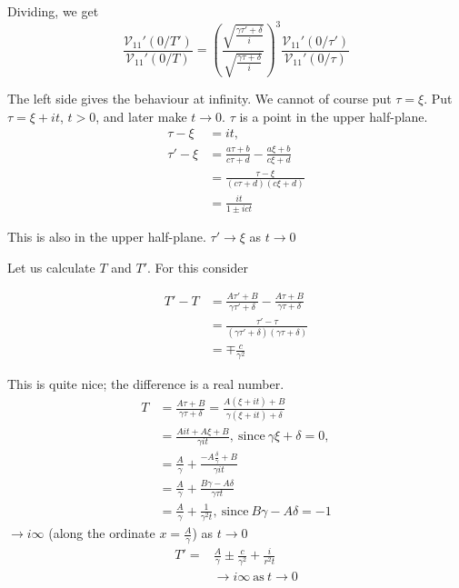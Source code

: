 Dividing, we get
\begin{equation*}
  \frac{\mathscr{V}_{11}' (0/ T')}{\mathscr{V}_{11}'(0/ T)} =
  \left( \frac{\sqrt{\frac{\gamma \tau'+\delta}{i}}}{\sqrt{\frac{\gamma \tau
        + \delta}{i}}}\right)^3 \frac{\mathscr{V}_{11}' (0/
    \tau')}{\mathscr{V}_{11}' (0/ \tau)} \tag{1}\label{part2:lec15:eq1}
\end{equation*}

The left side gives the behaviour at infinity. We cannot of course put
$\tau = \xi$. Put $\tau = \xi + it$, $t > 0$, and later make $t \to
0$. $\tau$ is a point in the upper half-plane.
\begin{align*}
  \tau - \xi & = it,\\
  \tau' - \xi & = \frac{a \tau+b}{c\tau +d} - \frac{a \xi +b}{c \xi
    +d}\\
  & = \frac{ \tau - \xi}{(c \tau +d)(c \xi +d)}\\
  & = \frac{i t}{1 \pm i ct}
\end{align*}

This is also in the upper half-plane. $\tau' \to \xi$ as $t \to 0$

Let us calculate $T$ and $T'$. For this consider

\begin{align*}
  T' - T & = \frac{A \tau'+B}{\gamma \tau' + \delta} - \frac{A \tau +
    B}{\gamma \tau + \delta}\\
  & = \frac{\tau' - \tau}{(\gamma \tau' + \delta)(\gamma \tau +
    \delta)}\\
  & = \mp \frac{c}{\gamma^2}
\end{align*}\pageoriginale

This is quite nice; the difference is a real number.
\begin{align*}
  T & = \frac{A \tau + B}{\gamma \tau + \delta} = \frac{A (\xi + i t)+
    B}{\gamma (\xi + i t)+ \delta}\\
  & = \frac{A i t+ A \xi + B}{\gamma i t}, ~\text{since}~ \gamma \xi +
  \delta =0,\\
  & = \frac{A}{\gamma} + \frac{ -A \frac{\delta}{\gamma}+ B}{\gamma i
    t}\\
  & = \frac A \gamma + \frac{B \gamma - A \delta}{\gamma \tau t}\\
  & = \frac A \gamma + \frac{1}{\gamma^2 t}, ~\text{since}~ B \gamma -
  A \delta =- 1
\end{align*}
$\to i \infty$ (along the ordinate  $x = \frac{A}{\gamma}$) as $t \to
0$
\begin{align*}
  T' = & \frac{A}{\gamma} \pm \frac{c}{\gamma^2} + \frac{i}{r^2 t}\\
  & \to i \infty ~\text{as}~ t \to 0
\end{align*}

